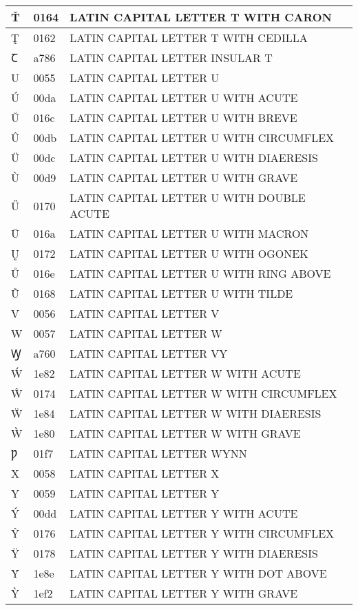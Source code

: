 \documentclass[12pt,letterpaper,openany]{book}
\begin{document}
\begin{center}
\begin{supertabular}{|m{0.25in}|m{0.5in}|m{4in}|}
Ť & 0164 & LATIN CAPITAL LETTER T WITH CARON\\\hline
Ţ & 0162 & LATIN CAPITAL LETTER T WITH CEDILLA\\\hline
Ꞇ & a786 & LATIN CAPITAL LETTER INSULAR T\\\hline
U & 0055 & LATIN CAPITAL LETTER U\\\hline
Ú & 00da & LATIN CAPITAL LETTER U WITH ACUTE\\\hline
Ŭ & 016c & LATIN CAPITAL LETTER U WITH BREVE\\\hline
Û & 00db & LATIN CAPITAL LETTER U WITH CIRCUMFLEX\\\hline
Ü & 00dc & LATIN CAPITAL LETTER U WITH DIAERESIS\\\hline
Ù & 00d9 & LATIN CAPITAL LETTER U WITH GRAVE\\\hline
Ű & 0170 & LATIN CAPITAL LETTER U WITH DOUBLE ACUTE\\\hline
Ū & 016a & LATIN CAPITAL LETTER U WITH MACRON\\\hline
Ų & 0172 & LATIN CAPITAL LETTER U WITH OGONEK\\\hline
Ů & 016e & LATIN CAPITAL LETTER U WITH RING ABOVE\\\hline
Ũ & 0168 & LATIN CAPITAL LETTER U WITH TILDE\\\hline
V & 0056 & LATIN CAPITAL LETTER V\\\hline
W & 0057 & LATIN CAPITAL LETTER W\\\hline
Ꝡ & a760 & LATIN CAPITAL LETTER VY\\\hline
Ẃ & 1e82 & LATIN CAPITAL LETTER W WITH ACUTE\\\hline
Ŵ & 0174 & LATIN CAPITAL LETTER W WITH CIRCUMFLEX\\\hline
Ẅ & 1e84 & LATIN CAPITAL LETTER W WITH DIAERESIS\\\hline
Ẁ & 1e80 & LATIN CAPITAL LETTER W WITH GRAVE\\\hline
Ƿ & 01f7 & LATIN CAPITAL LETTER WYNN\\\hline
X & 0058 & LATIN CAPITAL LETTER X\\\hline
Y & 0059 & LATIN CAPITAL LETTER Y\\\hline
Ý & 00dd & LATIN CAPITAL LETTER Y WITH ACUTE\\\hline
Ŷ & 0176 & LATIN CAPITAL LETTER Y WITH CIRCUMFLEX\\\hline
Ÿ & 0178 & LATIN CAPITAL LETTER Y WITH DIAERESIS\\\hline
Ẏ & 1e8e & LATIN CAPITAL LETTER Y WITH DOT ABOVE\\\hline
Ỳ & 1ef2 & LATIN CAPITAL LETTER Y WITH GRAVE\\\hline

\end{supertabular}
\end{center}
\end{document}
